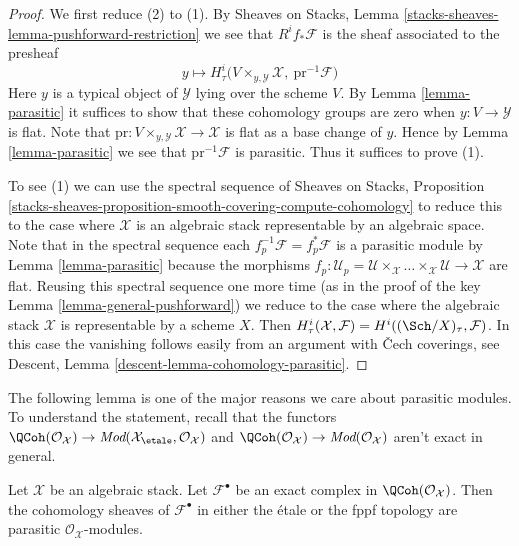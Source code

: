 \begin{proof}
We first reduce (2) to (1).
By Sheaves on Stacks, Lemma \ref{stacks-sheaves-lemma-pushforward-restriction}
we see that $R^if_*\mathcal{F}$ is the sheaf associated to the presheaf
$$
y \longmapsto
H^i_\tau\Big(V \times_{y, \mathcal{Y}} \mathcal{X},
\ \text{pr}^{-1}\mathcal{F}\Big)
$$
Here $y$ is a typical object of $\mathcal{Y}$ lying over the scheme $V$.
By Lemma \ref{lemma-parasitic} it suffices to show that
these cohomology groups are zero when $y : V \to \mathcal{Y}$ is flat.
Note that $\text{pr} : V \times_{y, \mathcal{Y}} \mathcal{X} \to \mathcal{X}$
is flat as a base change of $y$. Hence by
Lemma \ref{lemma-parasitic} we see that $\text{pr}^{-1}\mathcal{F}$
is parasitic. Thus it suffices to prove (1).

\medskip\noindent
To see (1) we can use the spectral sequence of
Sheaves on Stacks, Proposition
\ref{stacks-sheaves-proposition-smooth-covering-compute-cohomology}
to reduce this to the case where $\mathcal{X}$
is an algebraic stack representable by an algebraic space.
Note that in the spectral sequence each
$f_p^{-1}\mathcal{F} = f_p^*\mathcal{F}$ is a parasitic module by
Lemma \ref{lemma-parasitic} because the morphisms
$f_p : \mathcal{U}_p =
\mathcal{U} \times_\mathcal{X} \ldots
\times_\mathcal{X} \mathcal{U} \to \mathcal{X}$ are flat.
Reusing this spectral sequence one more time (as in the
proof of the key Lemma \ref{lemma-general-pushforward})
we reduce to the case where the
algebraic stack $\mathcal{X}$ is representable by a scheme $X$.
Then $H^i_\tau(\mathcal{X}, \mathcal{F}) = H^i((\Sch/X)_\tau, \mathcal{F})$.
In this case the vanishing follows easily from an argument
with {\v C}ech coverings, see
Descent, Lemma \ref{descent-lemma-cohomology-parasitic}.
\end{proof}

\noindent
The following lemma is one of the major reasons we care about
parasitic modules. To understand the statement, recall that
the functors
$\QCoh(\mathcal{O}_\mathcal{X}) \to
\textit{Mod}(\mathcal{X}_\etale, \mathcal{O}_\mathcal{X})$
and
$\QCoh(\mathcal{O}_\mathcal{X}) \to
\textit{Mod}(\mathcal{O}_\mathcal{X})$
aren't exact in general.

\begin{lemma}
\label{lemma-exact-sequence-quasi-coherent-parasitic-cohomology}
Let $\mathcal{X}$ be an algebraic stack. Let
$\mathcal{F}^\bullet$ be an
exact complex in $\QCoh(\mathcal{O}_\mathcal{X})$.
Then the cohomology sheaves of $\mathcal{F}^\bullet$
in either the \'etale or the fppf topology
are parasitic $\mathcal{O}_\mathcal{X}$-modules.
\end{lemma}


